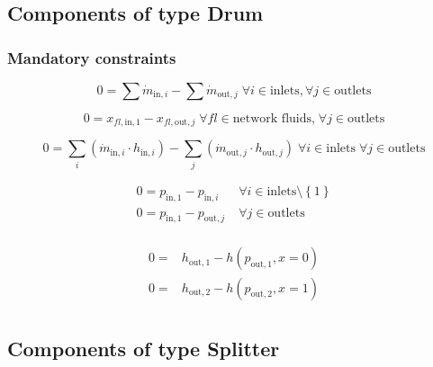 \documentclass[]{article}
\begin{document}
\subsection{Components of type Drum}

\subsubsection{Mandatory constraints}

\begin{equation}
\label{eq:Drum_mass_flow_constraints}
0 =\sum\dot{m}_{\mathrm{in},i}-\sum\dot{m}_{\mathrm{out},j}\;\forall i \in \text{inlets}, \forall j \in \text{outlets}
\end{equation}

\begin{equation}
\label{eq:Drum_fluid_constraints}
0 = x_{fl\mathrm{,in,1}} - x_{fl\mathrm{,out,}j}\; \forall fl \in \text{network fluids,} \; \forall j \in\text{outlets}
\end{equation}

\begin{equation}
\label{eq:Drum_energy_balance_constraints}
0=\sum_i\left(\dot{m}_{\mathrm{in,}i}\cdot h_{\mathrm{in,}i}\right) - \sum_j \left(\dot{m}_{\mathrm{out,}j} \cdot h_{\mathrm{out,}j} \right) \; \forall i \in \text{inlets} \;\forall j \in \text{outlets}
\end{equation}

\begin{equation}
\label{eq:Drum_pressure_constraints}
\begin{split}
0 = p_\mathrm{in,1} - p_{\mathrm{in,}i} & \; \forall i \in \text{inlets} \setminus \left\lbrace 1\right\rbrace\\
0 = p_\mathrm{in,1} - p_{\mathrm{out,}j} & \; \forall j \in \text{outlets}\\
\end{split}
\end{equation}

\begin{equation}
\label{eq:Drum_outlet_constraints}
\begin{split}
0 =&h_\mathrm{out,1} -h\left(p_\mathrm{out,1}, x=0\right)\\0 =&h_\mathrm{out,2} -h\left(p_\mathrm{out,2}, x=1\right)\\\end{split}
\end{equation}


\subsection{Components of type Splitter}
\end{document}
